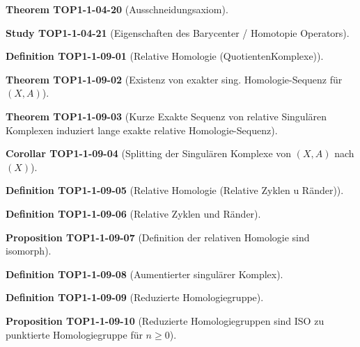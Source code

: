 \documentclass[10pt, letterpaper]{article}
\newcommand{\CustomHeading}[3]{%
  \par\medskip\noindent%
  \textbf{#1 #2} \textnormal{(#3)}.\enskip%
}
\newenvironment{DEF}[2]{\CustomHeading{Definition}{#1}{#2}}{}
\newenvironment{PROP}[2]{\CustomHeading{Proposition}{#1}{#2}}{}
\newenvironment{THEO}[2]{\CustomHeading{Theorem}{#1}{#2}}{}
\newenvironment{KORO}[2]{\CustomHeading{Corollar}{#1}{#2}}{}
\newenvironment{STUD}[2]{\CustomHeading{Study}{#1}{#2}}{}
\begin{document}
\begin{THEO}{TOP1-1-04-20}{Ausschneidungsaxiom}
\end{THEO}

\begin{STUD}{TOP1-1-04-21}{Eigenschaften des Barycenter / Homotopie Operators}
\end{STUD}

\begin{DEF}{TOP1-1-09-01}{Relative Homologie (QuotientenKomplexe)}
\end{DEF}

\begin{THEO}{TOP1-1-09-02}{Existenz von exakter sing. Homologie-Sequenz für $(X,A)$}
\end{THEO}

\begin{THEO}{TOP1-1-09-03}{Kurze Exakte Sequenz von relative Singulären Komplexen induziert lange exakte relative Homologie-Sequenz}
\end{THEO}

\begin{KORO}{TOP1-1-09-04}{Splitting der Singulären Komplexe von $(X,A)$ nach $(X)$}
\end{KORO}

\begin{DEF}{TOP1-1-09-05}{Relative Homologie (Relative Zyklen u Ränder)}
\end{DEF}

\begin{DEF}{TOP1-1-09-06}{Relative Zyklen und Ränder}
\end{DEF}

\begin{PROP}{TOP1-1-09-07}{Definition der relativen Homologie sind isomorph}
\end{PROP}

\begin{DEF}{TOP1-1-09-08}{Aumentierter singulärer Komplex}
\end{DEF}

\begin{DEF}{TOP1-1-09-09}{Reduzierte Homologiegruppe}
\end{DEF}

\begin{PROP}{TOP1-1-09-10}{Reduzierte Homologiegruppen sind ISO zu punktierte Homologiegruppe für $n\geq 0$}
\end{PROP}

\pagebreak
\printbibliography
\end{document}
